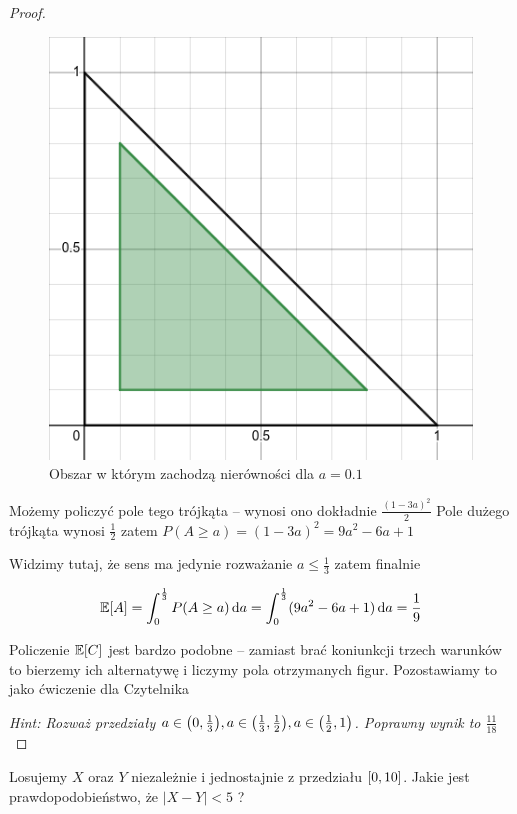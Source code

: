 \begin{proof}
\begin{figure}[H]
    \centering
    \includegraphics[scale=0.5]{img/continuous probability/breaking-stick-minimum-area.png}
    \caption{Obszar w którym zachodzą nierówności dla \(a = 0.1\)}
\end{figure}

Możemy policzyć pole tego trójkąta -- wynosi ono dokładnie \( \frac{(1 - 3a)^2}{2} \)
Pole dużego trójkąta wynosi \(\frac{1}{2}\) zatem \( P(A \geq a) = (1 - 3a)^2 = 9a^2 - 6a + 1 \)

Widzimy tutaj, że sens ma jedynie rozważanie \(a \leq \frac{1}{3} \) zatem finalnie

\[
    \expected{A} = \int_0^{\frac{1}{3}} P(A \geq a) \diff a
    = \int_0^{\frac{1}{3}} (9a^2 - 6a + 1) \diff a = \frac{1}{9}
\]

Policzenie \(\expected{C}\) jest bardzo podobne -- zamiast brać koniunkcji trzech warunków
to bierzemy ich alternatywę i liczymy pola otrzymanych figur. Pozostawiamy to jako ćwiczenie dla Czytelnika

\textit{Hint: Rozważ przedziały \( a \in \pars{0, \frac{1}{3}}, a \in \pars{\frac{1}{3}, \frac{1}{2}}, a \in \pars{\frac{1}{2}, 1} \). Poprawny wynik to \(\frac{11}{18}\)}
\end{proof}
\newpage
\begin{exercise}
    Losujemy \( X \) oraz \( Y \) niezależnie i jednostajnie z przedziału \( \left[0, 10\right] \).
    Jakie jest prawdopodobieństwo, że \( |X - Y| < 5 \) ? 
\end{exercise}
